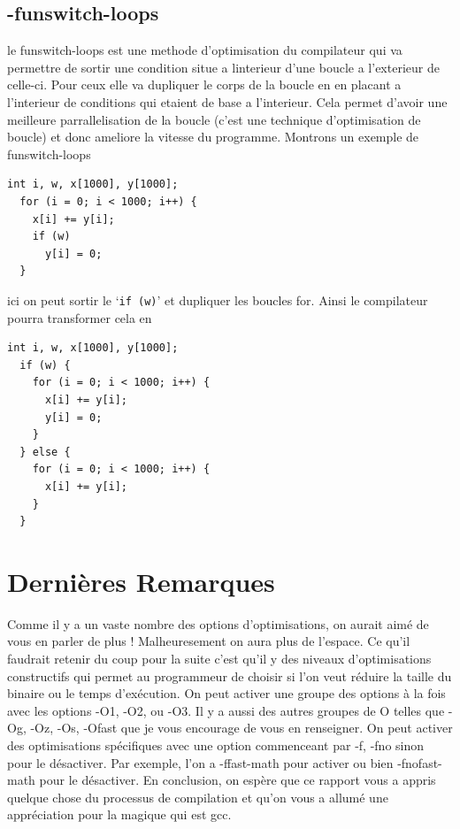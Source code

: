 \documentclass[11pt]{article} %
\begin{document}
\subsection*{-funswitch-loops}
le funswitch-loops est une methode d’optimisation du compilateur qui va permettre de sortir une condition situe a
linterieur d’une boucle a l’exterieur de celle-ci. Pour ceux elle va dupliquer le corps de la boucle en en placant
a l’interieur de conditions qui etaient de base a l’interieur. Cela permet d’avoir une meilleure parrallelisation de
 la boucle (c’est une technique d’optimisation de boucle) et donc ameliore la vitesse du programme. Montrons un exemple de funswitch-loops
\begin{verbatim}
int i, w, x[1000], y[1000];
  for (i = 0; i < 1000; i++) {
    x[i] += y[i];
    if (w)
      y[i] = 0;
  }
\end{verbatim}
ici on peut sortir le `\verb|if (w)|' et dupliquer les boucles for.
Ainsi le compilateur pourra transformer cela en
\begin{verbatim}
int i, w, x[1000], y[1000];
  if (w) {
    for (i = 0; i < 1000; i++) {
      x[i] += y[i];
      y[i] = 0;
    }
  } else {
    for (i = 0; i < 1000; i++) {
      x[i] += y[i];
    }
  }
\end{verbatim}

\section*{Dernières Remarques}
Comme il y a un vaste nombre des options d'optimisations, on aurait aimé de vous en parler de plus ! Malheuresement on aura plus de l'espace. Ce qu'il faudrait
retenir du coup pour la suite c'est qu'il y des niveaux d'optimisations constructifs qui permet au programmeur de choisir si l'on veut réduire la taille du binaire
ou le temps d'exécution. On peut activer une groupe des options \`a la fois avec les options -O1, -O2, ou -O3. Il y a aussi des autres groupes de O telles que -Og, -Oz, -Os, -Ofast
que je vous encourage de vous en renseigner. On peut activer des optimisations spécifiques avec une
option commenceant par -f, -fno sinon pour le désactiver. Par exemple, l'on a -ffast-math pour activer ou bien -fnofast-math pour le désactiver.
En conclusion, on espère que ce rapport vous a appris quelque chose du processus de compilation et qu'on vous a allumé une appréciation pour la magique qui est gcc.
\end{document}
